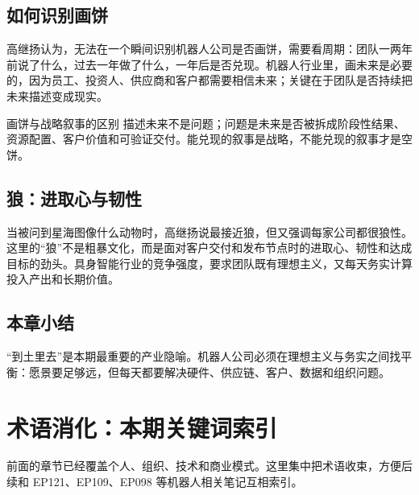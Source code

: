 \documentclass[a4paper]{article}
\begin{document}
\subsection{如何识别画饼}

高继扬认为，无法在一个瞬间识别机器人公司是否画饼，需要看周期：团队一两年前说了什么，过去一年做了什么，一年后是否兑现。机器人行业里，画未来是必要的，因为员工、投资人、供应商和客户都需要相信未来；关键在于团队是否持续把未来描述变成现实。

\begin{importantbox}{画饼与战略叙事的区别}
描述未来不是问题；问题是未来是否被拆成阶段性结果、资源配置、客户价值和可验证交付。能兑现的叙事是战略，不能兑现的叙事才是空饼。
\end{importantbox}

\subsection{狼：进取心与韧性}

当被问到星海图像什么动物时，高继扬说最接近狼，但又强调每家公司都很狼性。这里的“狼”不是粗暴文化，而是面对客户交付和发布节点时的进取心、韧性和达成目标的劲头。具身智能行业的竞争强度，要求团队既有理想主义，又每天务实计算投入产出和长期价值。

\subsection{本章小结}

“到土里去”是本期最重要的产业隐喻。机器人公司必须在理想主义与务实之间找平衡：愿景要足够远，但每天都要解决硬件、供应链、客户、数据和组织问题。

\section{术语消化：本期关键词索引}

前面的章节已经覆盖个人、组织、技术和商业模式。这里集中把术语收束，方便后续和 EP121、EP109、EP098 等机器人相关笔记互相索引。
\end{document}
